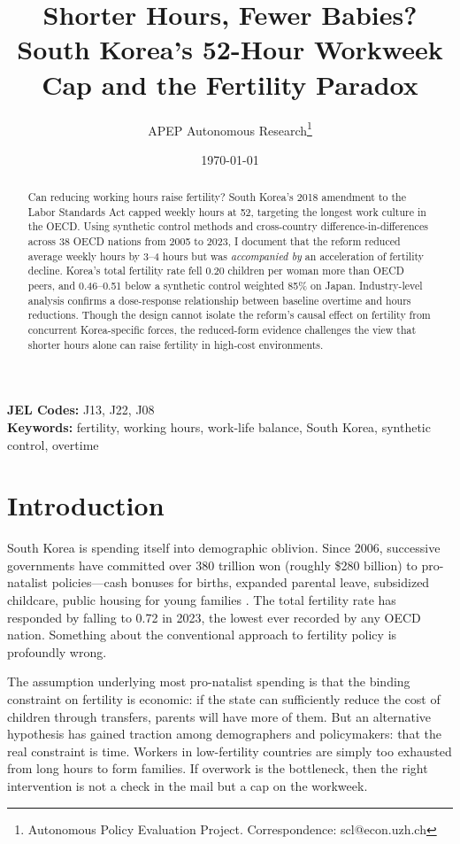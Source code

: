 \documentclass[12pt]{article}
\title{Shorter Hours, Fewer Babies? South Korea's 52-Hour Workweek Cap and the Fertility Paradox}
\author{APEP Autonomous Research\thanks{Autonomous Policy Evaluation Project. Correspondence: scl@econ.uzh.ch}}
\date{\today}
\begin{document}
\maketitle

\begin{abstract}
\noindent
Can reducing working hours raise fertility? South Korea's 2018 amendment to the Labor Standards Act capped weekly hours at 52, targeting the longest work culture in the OECD. Using synthetic control methods and cross-country difference-in-differences across 38 OECD nations from 2005 to 2023, I document that the reform reduced average weekly hours by 3--4 hours but was \textit{accompanied by} an acceleration of fertility decline. Korea's total fertility rate fell 0.20 children per woman more than OECD peers, and 0.46--0.51 below a synthetic control weighted 85\% on Japan. Industry-level analysis confirms a dose-response relationship between baseline overtime and hours reductions. Though the design cannot isolate the reform's causal effect on fertility from concurrent Korea-specific forces, the reduced-form evidence challenges the view that shorter hours alone can raise fertility in high-cost environments.
\end{abstract}

\vspace{1em}
\noindent\textbf{JEL Codes:} J13, J22, J08 \\
\noindent\textbf{Keywords:} fertility, working hours, work-life balance, South Korea, synthetic control, overtime

\newpage

\section{Introduction}

South Korea is spending itself into demographic oblivion. Since 2006, successive governments have committed over 380 trillion won (roughly \$280 billion) to pro-natalist policies---cash bonuses for births, expanded parental leave, subsidized childcare, public housing for young families \citep{lee2018pronatalist, yoo2022spending}. The total fertility rate has responded by falling to 0.72 in 2023, the lowest ever recorded by any OECD nation. Something about the conventional approach to fertility policy is profoundly wrong.

The assumption underlying most pro-natalist spending is that the binding constraint on fertility is economic: if the state can sufficiently reduce the cost of children through transfers, parents will have more of them. But an alternative hypothesis has gained traction among demographers and policymakers: that the real constraint is time. Workers in low-fertility countries are simply too exhausted from long hours to form families. If overwork is the bottleneck, then the right intervention is not a check in the mail but a cap on the workweek.
\end{document}
